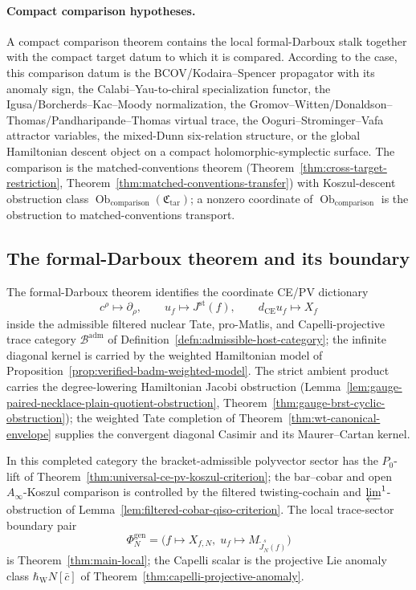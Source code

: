 \documentclass[11pt]{memoir}
\begin{document}
\paragraph{Compact comparison hypotheses.}  A compact comparison
theorem contains the local formal-Darboux stalk together with the
compact target datum to which it is compared.  According to the case, this
comparison datum is the BCOV/Kodaira--Spencer propagator with its anomaly sign,
the Calabi--Yau-to-chiral specialization functor, the
Igusa/Borcherds--Kac--Moody normalization, the
Gromov--Witten/Donaldson--Thomas/Pandharipande--Thomas virtual trace,
the Ooguri--Strominger--Vafa attractor variables, the mixed-Dunn
six-relation structure, or the global Hamiltonian descent object on a
compact holomorphic-symplectic surface.  The comparison is the
matched-conventions theorem
(Theorem~\ref{thm:cross-target-restriction},
Theorem~\ref{thm:matched-conventions-transfer}) with Koszul-descent
obstruction class
\(\operatorname{Ob}_{\mathrm{comparison}}(\mathfrak C_{\mathrm{tar}})\); a
nonzero coordinate of \(\operatorname{Ob}_{\mathrm{comparison}}\) is the
obstruction to matched-conventions transport.

\subsection*{The formal-Darboux theorem and its boundary}
\label{ssec:proof-boundary-table}

The formal-Darboux theorem identifies the coordinate CE/PV dictionary
\[
  c^\rho\longmapsto\partial_\rho,\qquad
  u_f\longmapsto J^{\mathrm{st}}(f),\qquad
  d_{\mathrm{CE}}u_f\longmapsto X_f
\]
inside the admissible filtered nuclear Tate, pro-Matlis, and
Capelli-projective trace category \(\mathcal B^{\mathrm{adm}}\) of
Definition~\ref{defn:admissible-host-category}; the infinite diagonal
kernel is carried by the weighted Hamiltonian model of
Proposition~\ref{prop:verified-badm-weighted-model}.
The strict ambient product carries the degree-lowering Hamiltonian
Jacobi obstruction
(Lemma~\ref{lem:gauge-paired-necklace-plain-quotient-obstruction},
Theorem~\ref{thm:gauge-brst-cyclic-obstruction}); the weighted Tate
completion of Theorem~\ref{thm:wt-canonical-envelope} supplies the
convergent diagonal Casimir and its Maurer--Cartan kernel.

In this completed category the bracket-admissible polyvector sector
has the \(P_0\)-lift of
Theorem~\ref{thm:universal-ce-pv-koszul-criterion}; the bar--cobar and
open \(A_\infty\)-Koszul comparison is controlled by the filtered
twisting-cochain and \(\varprojlim^1\)-obstruction of
Lemma~\ref{lem:filtered-cobar-qiso-criterion}.  The local trace-sector
boundary pair
  \[
    \Phi_N^{\mathrm{gen}}
    =\bigl(f\mapsto X_{f,N},\;
      u_f\mapsto M_{\widetilde J_N^s(f)}\bigr)
  \]
is Theorem~\ref{thm:main-local}; the Capelli scalar is the projective
Lie anomaly class \(\hbar_{\mathrm{W}}N[\bar c]\) of
Theorem~\ref{thm:capelli-projective-anomaly}.
\end{document}
